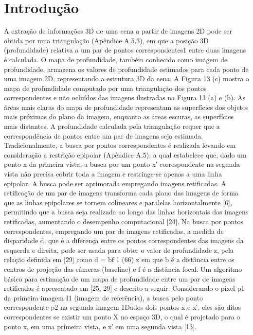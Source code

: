 \documentclass[conference]{IEEEtran}
\begin{document}
\section{Introdução}
A extração de informações 3D de uma cena a partir de imagens 2D pode ser obtida por uma triangulação (Apêndice A.5.3), em que a posição 3D (profundidade) relativa a um par de pontos correspondentes1 entre duas imagens é calculada. O mapa de profundidade, também conhecido como imagem de profundidade, armazena os valores de profundidade estimados para cada ponto de uma imagem 2D, representando a estrutura 3D da cena. A Figura 13 (c) mostra o mapa de profundidade computado por uma triangulação dos pontos correspondentes e não ocluídos das imagens ilustradas na Figura 13 (a) e (b). As áreas mais claras do mapa de profundidade representam as superfícies dos objetos mais próximas do plano da imagem, enquanto as áreas escuras, as superfícies mais distantes.
A profundidade calculada pela triangulação requer que a correspondência de pontos entre um par de imagens seja estimada. Tradicionalmente, a busca por pontos correspondentes é realizada levando em consideração a restrição epipolar (Apêndice A.5), a qual estabelece que, dado um ponto x da primeira vista, a busca por um ponto x′ correspondente na segunda vista não precisa cobrir toda a imagem e restringe-se apenas a uma linha epipolar. A busca pode ser aprimorada empregando imagens retificadas. A retificação de um par de imagens transforma cada plano das imagens de forma que as linhas epipolares se tornem colineares e paralelas horizontalmente [6], permitindo que a busca seja realizada ao longo das linhas horizontais das imagens retificadas, aumentando o desempenho computacional [24].
Na busca por pontos correspondentes, empregando um par de imagens retificadas, a medida de disparidade d, que é a diferença entre os pontos correspondentes das imagens da esquerda e direita, pode ser usada para obter o valor de profundidade z, pela relação definida em [29] como
d = bf 1 (66) z
em que b é a distância entre os centros de projeção das câmeras (baseline) e f é a distância focal. Um algoritmo básico para estimação de um mapa de profundidade entre um par de imagens retificadas é apresentado em [25, 29] e descrito a seguir. Considerando o pixel p1 da primeira imagem I1 (imagem de referência), a busca pelo ponto correspondente p2 na segunda imagem
1Dados dois pontos x e x′, eles são ditos correspondentes se existir um ponto X no espaço 3D, o qual é projetado para o ponto x, em uma primeira vista, e x′ em uma segunda vista [13].
\end{document}
